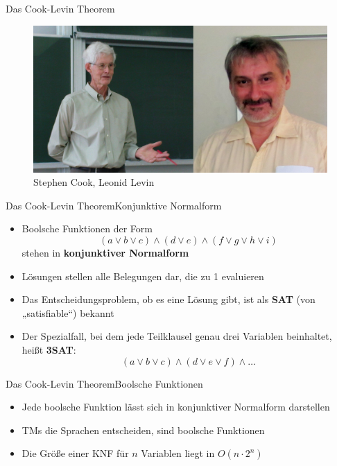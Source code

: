 \documentclass[ignorenonframetext,]{beamer}
\begin{document}
\begin{frame}{Das Cook-Levin Theorem}

\begin{figure}[htbp]
\centering
\includegraphics{img/cook_levin.png}\\

Stephen Cook, Leonid Levin
\end{figure}

\end{frame}

\begin{frame}{Das Cook-Levin Theorem}{Konjunktive Normalform}

\begin{itemize}
\itemsep1pt\parskip0pt
\item
  Boolsche Funktionen der Form
  \[(a \vee b \vee c) \wedge (d \vee e) \wedge (f \vee g \vee h \vee i)\]
  stehen in \textbf{konjunktiver Normalform}
\item
  Lösungen stellen alle Belegungen dar, die zu 1 evaluieren
\item
  Das Entscheidungsproblem, ob es eine Lösung gibt, ist als \textbf{SAT}
  (von „satisfiable``) bekannt
\item
  Der Spezialfall, bei dem jede Teilklausel genau drei Variablen
  beinhaltet, heißt \textbf{3SAT}:
  \[(a \vee b \vee c) \wedge (d \vee e \vee f) \wedge \dots\]
\end{itemize}

\end{frame}

\begin{frame}{Das Cook-Levin Theorem}{Boolsche Funktionen}

\begin{itemize}
\itemsep1pt\parskip0pt
\item
  Jede boolsche Funktion lässt sich in konjunktiver Normalform
  darstellen
\item
  TMs die Sprachen entscheiden, sind boolsche Funktionen
\item
  Die Größe einer KNF für $n$ Variablen liegt in $O(n \cdot 2^n)$
\end{itemize}

\end{frame}
\end{document}
